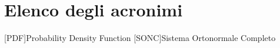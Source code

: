 \chapter*{Elenco degli acronimi}

\begin{acronym}
	[PDF]{\foreignlanguage{english}{Probability Density Function}}
	[SONC]{Sistema Ortonormale Completo}
\end{acronym}
